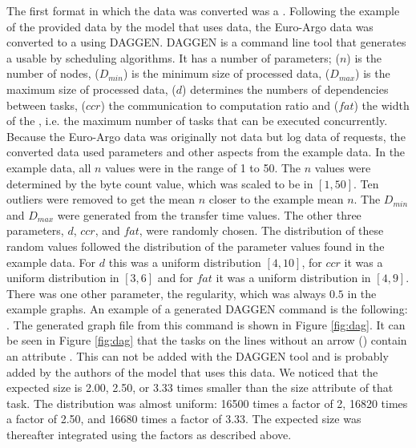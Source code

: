 The first format in which the data was converted was a \DAG. Following the
example of the provided data by the model that uses \DAG data\footnotemark,
the Euro-Argo data was converted to a \DAG using
DAGGEN. DAGGEN is a command line tool that
generates a \DAG usable by scheduling algorithms. It has a number of
parameters;  ($n$) is the number of nodes,  ($D_{min}$)
is the minimum size of processed data,  ($D_{max}$) is the
maximum size of processed data,  ($d$) determines the numbers of
dependencies between tasks,  ($ccr$) the communication to
computation ratio and  ($fat$) the width of the \DAG, i.e. the
maximum number of tasks that can be executed concurrently. Because the
Euro-Argo data was originally not \jss data but log data of requests, the
converted data used parameters and other aspects from the example data. In the
example data, all $n$ values were in the range of 1 to 50. The $n$ values were
determined by the byte count value, which was scaled to be in $[1, 50]$. Ten
outliers were removed to get the mean $n$ closer to the example mean $n$. The
$D_{min}$ and $D_{max}$ were generated from the transfer time values. The
other three parameters, $d$, $ccr$, and $fat$, were randomly chosen. The
distribution of these random values followed the distribution of the parameter
values found in the example data. For $d$ this was a uniform distribution
$[4, 10]$, for $ccr$ it was a uniform distribution in $[3, 6]$ and for $fat$
it was a uniform distribution in $[4, 9]$. There was one other parameter, the
regularity, which was always $0.5$ in the example graphs. An example of a
generated DAGGEN command is the following: . The generated graph file from this
command is shown in Figure \ref{fig:dag}. It can be seen in Figure \ref{fig:dag}
that the tasks on the lines without an arrow (\code{->}) contain an attribute
. This can not be added with the DAGGEN tool and is
probably added by the authors of the model that uses this data. We noticed
that the expected size is 2.00, 2.50, or 3.33 times smaller than the size
attribute of that task. The distribution was almost uniform: 16500 times a
factor of 2, 16820 times a factor of 2.50, and 16680 times a factor of 3.33.
The expected size was thereafter integrated using the factors as described
above.


